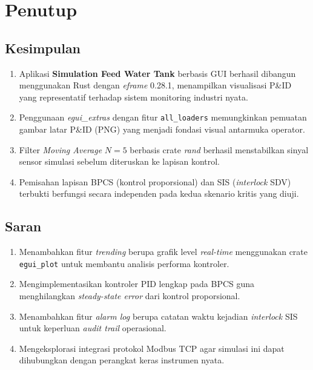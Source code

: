 \documentclass[12pt,a4paper]{article}
\begin{document}
\section{Penutup}

\subsection{Kesimpulan}
\begin{enumerate}
    \item Aplikasi \textbf{Simulation Feed Water Tank} berbasis GUI berhasil
          dibangun menggunakan Rust dengan \textit{eframe} 0.28.1,
          menampilkan visualisasi P\&ID yang representatif terhadap sistem
          monitoring industri nyata.
    \item Penggunaan \textit{egui\_extras} dengan fitur \texttt{all\_loaders}
          memungkinkan pemuatan gambar latar P\&ID (PNG) yang menjadi
          fondasi visual antarmuka operator.
    \item Filter \textit{Moving Average} $N=5$ berbasis crate \textit{rand}
          berhasil menstabilkan sinyal sensor simulasi sebelum diteruskan
          ke lapisan kontrol.
    \item Pemisahan lapisan BPCS (kontrol proporsional) dan SIS
          (\textit{interlock} SDV) terbukti berfungsi secara independen
          pada kedua skenario kritis yang diuji.
\end{enumerate}

\subsection{Saran}
\begin{enumerate}
    \item Menambahkan fitur \textit{trending} berupa grafik level
          \textit{real-time} menggunakan crate \texttt{egui\_plot} untuk
          membantu analisis performa kontroler.
    \item Mengimplementasikan kontroler PID lengkap pada BPCS guna
          menghilangkan \textit{steady-state error} dari kontrol proporsional.
    \item Menambahkan fitur \textit{alarm log} berupa catatan waktu kejadian
          \textit{interlock} SIS untuk keperluan \textit{audit trail}
          operasional.
    \item Mengeksplorasi integrasi protokol Modbus TCP agar simulasi ini
          dapat dihubungkan dengan perangkat keras instrumen nyata.
\end{enumerate}
\end{document}
